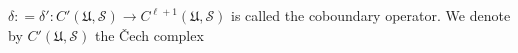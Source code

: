 $\delta: = \delta' : C'(\mathfrak{U}, \mathcal{S}) \rightarrow C^{\ell+1}(\mathfrak{U}, \mathcal{S})$ is called the coboundary operator. We denote by $C'(\mathfrak{U}, \mathcal{S})$ the Čech complex
